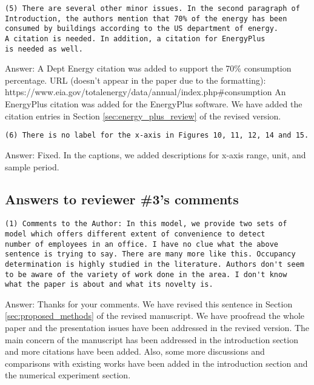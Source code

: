 \begin{verbatim}
(5) There are several other minor issues. In the second paragraph of
Introduction, the authors mention that 70% of the energy has been
consumed by buildings according to the US department of energy.
A citation is needed. In addition, a citation for EnergyPlus
is needed as well.
\end{verbatim}

Answer: A Dept Energy citation was added to support the 70\% consumption
percentage.  URL (doesn't appear in the paper due to the formatting):
https://www.eia.gov/totalenergy/data/annual/index.php\#consumption An
EnergyPlus citation was added for the EnergyPlus software. We have added the
citation entries in Section \ref{sec:energy_plus_review} of the revised version.

\begin{verbatim}
(6) There is no label for the x-axis in Figures 10, 11, 12, 14 and 15.
\end{verbatim}

Answer: Fixed. In the captions, we added descriptions for x-axis range, unit, and
sample period.

\subsection{Answers to reviewer \#3's comments}
\begin{verbatim}
(1) Comments to the Author: In this model, we provide two sets of
model which offers different extent of convenience to detect
number of employees in an office. I have no clue what the above
sentence is trying to say. There are many more like this. Occupancy
determination is highly studied in the literature. Authors don't seem
to be aware of the variety of work done in the area. I don't know
what the paper is about and what its novelty is.
\end{verbatim}

Answer: Thanks for your comments. We have revised this sentence in
Section \ref{sec:proposed_methods} of the revised manuscript. We have
proofread the whole paper and the presentation issues have been
addressed in the revised version. The main concern of the manuscript
has been addressed in the introduction section and more citations have
been added. Also, some more discussions and comparisons with
existing works have been added in the introduction section and the
numerical experiment section.

